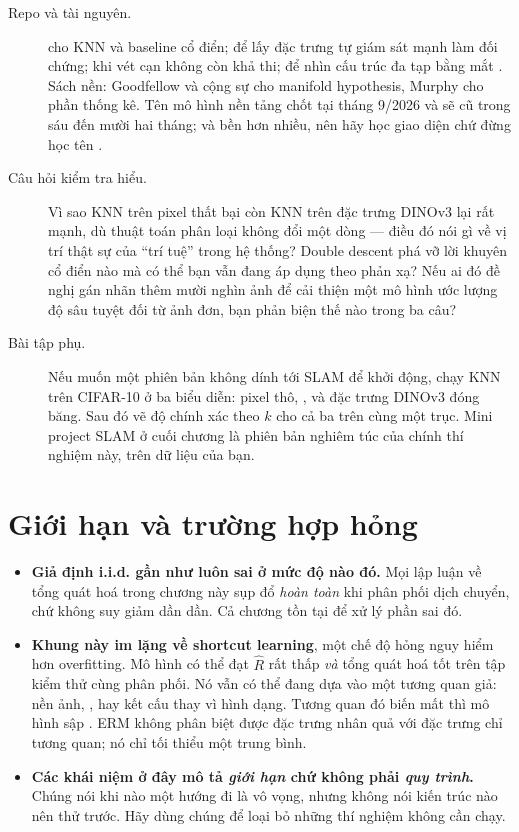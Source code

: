 \documentclass[../../deep_learning.tex]{subfiles}
\begin{document}
\begin{description}
\item[Repo và tài nguyên.]  cho KNN và baseline cổ điển;  để lấy đặc trưng tự giám sát mạnh làm đối chứng;  khi vét cạn không còn khả thi;  để nhìn cấu trúc đa tạp bằng mắt \cite{mcinnes2018umap}. Sách nền: Goodfellow và cộng sự \cite{goodfellow2016} cho manifold hypothesis, Murphy \cite{murphy2022} cho phần thống kê. Tên mô hình nền tảng chốt tại tháng 9/2026 và sẽ cũ trong sáu đến mười hai tháng;  và  bền hơn nhiều, nên hãy học giao diện chứ đừng học tên .
\item[Câu hỏi kiểm tra hiểu.] Vì sao KNN trên pixel thất bại còn KNN trên đặc trưng DINOv3 lại rất mạnh, dù thuật toán phân loại không đổi một dòng --- điều đó nói gì về vị trí thật sự của ``trí tuệ'' trong hệ thống? Double descent phá vỡ lời khuyên cổ điển nào mà có thể bạn vẫn đang áp dụng theo phản xạ? Nếu ai đó đề nghị gán nhãn thêm mười nghìn ảnh để cải thiện một mô hình ước lượng độ sâu tuyệt đối từ ảnh đơn, bạn phản biện thế nào trong ba câu?
\item[Bài tập phụ.] Nếu muốn một phiên bản không dính tới SLAM để khởi động, chạy KNN trên CIFAR-10 ở ba biểu diễn: pixel thô, , và đặc trưng DINOv3 đóng băng. Sau đó vẽ độ chính xác theo \(k\) cho cả ba trên cùng một trục. Mini project SLAM ở cuối chương là phiên bản nghiêm túc của chính thí nghiệm này, trên dữ liệu của bạn.
\end{description}

\section{Giới hạn và trường hợp hỏng}

\begin{itemize}
\item \textbf{Giả định i.i.d. gần như luôn sai ở mức độ nào đó.} Mọi lập luận về tổng quát hoá trong chương này sụp đổ \emph{hoàn toàn} khi phân phối dịch chuyển, chứ không suy giảm dần dần. Cả chương  tồn tại để xử lý phần sai đó.
\item \textbf{Khung này im lặng về shortcut learning}, một chế độ hỏng nguy hiểm hơn overfitting. Mô hình có thể đạt \(\hat{R}\) rất thấp \emph{và} tổng quát hoá tốt trên tập kiểm thử cùng phân phối. Nó vẫn có thể đang dựa vào một tương quan giả: nền ảnh, , hay kết cấu thay vì hình dạng. Tương quan đó biến mất thì mô hình sập \cite{geirhos2020shortcut}. ERM không phân biệt được đặc trưng nhân quả với đặc trưng chỉ tương quan; nó chỉ tối thiểu một trung bình.
\item \textbf{Các khái niệm ở đây mô tả \emph{giới hạn} chứ không phải \emph{quy trình}.} Chúng nói khi nào một hướng đi là vô vọng, nhưng không nói kiến trúc nào nên thử trước. Hãy dùng chúng để loại bỏ những thí nghiệm không cần chạy.
\end{itemize}
\end{document}

